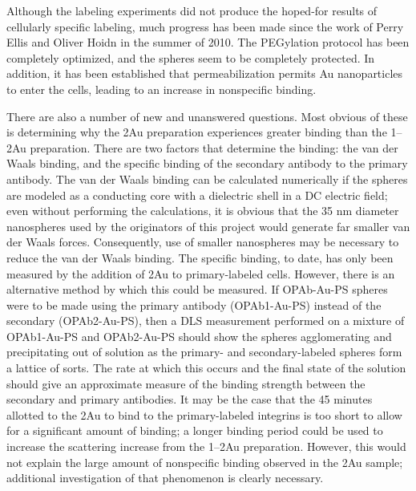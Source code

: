 Although the labeling experiments did not produce the hoped-for results of cellularly specific labeling, much progress has been made since the work of Perry Ellis and Oliver Hoidn in the summer of 2010. The PEGylation protocol has been completely optimized, and the spheres seem to be completely protected. In addition, it has been established that permeabilization permits Au nanoparticles to enter the cells, leading to an increase in nonspecific binding.

There are also a number of new and unanswered questions. Most obvious of these is determining why the 2Au preparation experiences greater binding than the 1--2Au preparation. There are two factors that determine the binding: the van der Waals binding, and the specific binding of the secondary antibody to the primary antibody. The van der Waals binding can be calculated numerically if the spheres are modeled as a conducting core with a dielectric shell in a DC electric field; even without performing the calculations, it is obvious that the 35 nm diameter nanospheres used by the originators of this project would generate far smaller van der Waals forces. Consequently, use of smaller nanospheres may be necessary to reduce the van der Waals binding. The specific binding, to date, has only been measured by the addition of 2Au to primary-labeled cells. However, there is an alternative method by which this could be measured. If OPAb-Au-PS spheres were to be made using the primary antibody (OPAb1-Au-PS) instead of the secondary (OPAb2-Au-PS), then a DLS measurement performed on a mixture of OPAb1-Au-PS and OPAb2-Au-PS should show the spheres agglomerating and precipitating out of solution as the primary- and secondary-labeled spheres form a lattice of sorts. The rate at which this occurs and the final state of the solution should give an approximate measure of the binding strength between the secondary and primary antibodies. It may be the case that the 45 minutes allotted to the 2Au to bind to the primary-labeled integrins is too short to allow for a significant amount of binding; a longer binding period could be used to increase the scattering increase from the 1--2Au preparation. However, this would not explain the large amount of nonspecific binding observed in the 2Au sample; additional investigation of that phenomenon is clearly necessary.
